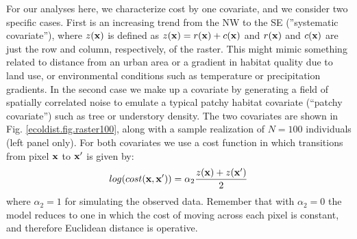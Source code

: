 For our analyses here, we characterize cost by one covariate, 
and we consider two specific cases. First is an increasing trend from
the NW to the SE (''systematic covariate''), where $z({\bf x})$ is defined as
$z({\bf x}) = r({\bf x}) + c({\bf x})$ and $r({\bf x})$ and $c({\bf x})$ are just the row and
column, respectively, of the raster.  This might mimic something
related to distance from an urban area or a gradient in habitat
quality due to land use, or environmental conditions such as
temperature or precipitation gradients.  In the second case we make up
a covariate by generating a field of spatially correlated noise to
emulate a typical patchy habitat covariate (``patchy covariate'') such as
tree or understory density. The two covariates are shown in
Fig. \ref{ecoldist.fig.raster100}, along with a sample realization of
$N=100$ individuals (left panel only).  For both covariates we use a
cost function in which transitions from pixel ${\bf x}$ to ${\bf x}'$
is given by:
\[
 log(cost({\bf x},{\bf x}'))=  \alpha_2 \frac{z({\bf x}) + z({\bf x}')}{2}
\]
where $\alpha_2 = 1$ for simulating the observed data.
 Remember that with $\alpha_2=0$ the
model reduces to one in which the cost of moving across each pixel is
constant, and therefore Euclidean distance is operative.

